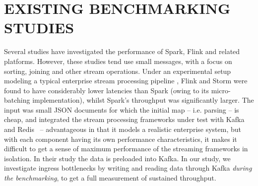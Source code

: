 \documentclass[conference]{IEEEtran}
\begin{document}
\section{EXISTING BENCHMARKING STUDIES}\label{benchmarking}
Several studies have investigated the performance of Spark, Flink and related platforms. However, these studies tend use small messages, with a focus on sorting, joining and other stream operations.  Under an experimental setup modeling a typical enterprise stream processing pipeline \cite{chintapalliBenchmarkingStreamingComputation2016}, Flink and Storm were found to have considerably lower latencies than Spark (owing to its micro-batching implementation), whilst Spark's throughput was significantly larger. The input was small JSON documents for which the initial map -- i.e. parsing -- is cheap, and integrated the stream processing frameworks under test with Kafka~\cite{kreps2011kafka} and Redis~\cite{salvatoresanfilippoRedis2009} -- advantageous in that it models a realistic enterprise system, but with each component having its own performance characteristics, it makes it difficult to get a sense of maximum performance of the streaming frameworks in isolation. In their study the data is preloaded into Kafka. In our study, we investigate ingress bottlenecks by writing and reading data through Kafka \emph{during the benchmarking}, to get a full measurement of sustained throughput.
\end{document}
